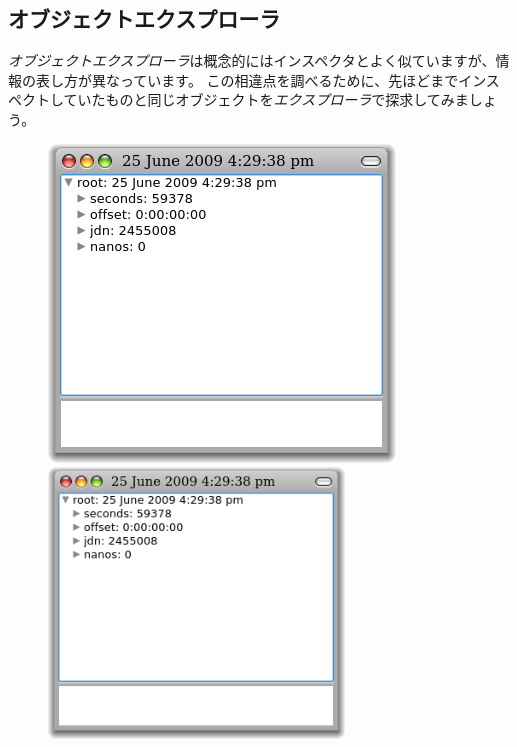 \documentclass[a4paper,10pt,twoside]{book}
\begin{document}
\subsection{オブジェクトエクスプローラ}

\emph{オブジェクトエクスプローラ}は概念的にはインスペクタとよく似ていますが、情報の表し方が異なっています。
この相違点を調べるために、先ほどまでインスペクトしていたものと同じオブジェクトを\emph{エクスプローラ}で探求してみましょう。

\begin{figure}[tbp]
\begin{minipage}{0.48\textwidth}
\begin{center}
\ifluluelse
{\includegraphics[width=\textwidth]{exploreTimeStampNow}}
{\includegraphics[width=0.7\textwidth]{exploreTimeStampNow}}

\end{center}
\end{minipage}
\end{figure}
\end{document}
